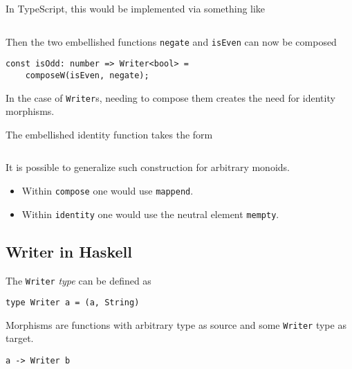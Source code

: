 \begin{remark}
    In TypeScript, this would be implemented via something like
    \inputminted{typescript}{content/code-listings/writer-compose.ts}
    
    Then the two embellished functions \texttt{negate} and \texttt{isEven} can now be composed
    
    \begin{verbatim}
const isOdd: number => Writer<bool> = 
    composeW(isEven, negate);
    \end{verbatim}
\end{remark}

\begin{remark}
    In the case of \texttt{Writer}s, needing to compose them creates the need for identity morphisms.
\end{remark}

\begin{definition}
    The embellished identity function takes the form
    \inputminted{typescript}{content/code-listings/writer-id.ts}
\end{definition}

\begin{remark}
    It is possible to generalize such construction for arbitrary monoids. 
    \begin{itemize}
        \item Within \texttt{compose} one would use \texttt{mappend}.
        \item Within \texttt{identity} one would use the neutral element \texttt{mempty}.
    \end{itemize}
\end{remark}

\subsection{Writer in Haskell}

\begin{definition}
    The \texttt{Writer} \textit{type} can be defined as
    \begin{verbatim}
type Writer a = (a, String)
    \end{verbatim}
\end{definition}

\begin{definition}
    Morphisms are functions with arbitrary type as source and some \texttt{Writer} type as target.
    \begin{verbatim}
a -> Writer b
    \end{verbatim}
\end{definition}


